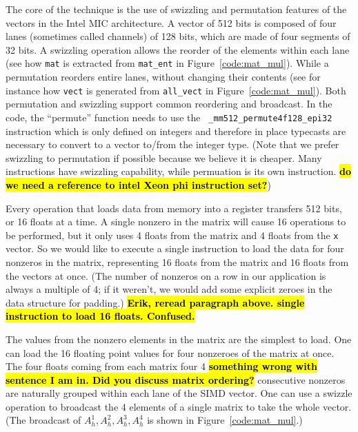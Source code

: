 \documentclass[10pt,conference,compsocconf]{IEEEtran}
\newcommand{\todo}[1]{{\color{red}\textbf{\hl{#1}}\xspace}}
\begin{document}
The core of the technique is the use of swizzling and permutation
features of the vectors in the Intel MIC architecture. A vector of 512
bits is composed of four lanes (sometimes called channels) of 128
bits, which are made of four segments of 32 bits. A swizzling
operation allows the reorder of the elements within each lane (see how
{\tt mat} is extracted from {\tt mat\_ent} in
Figure~\ref{code:mat_mul}). While a permutation reorders entire lanes,
without changing their contents (see for instance how {\tt vect} is
generated from {\tt all\_vect} in Figure~\ref{code:mat_mul}).  Both
permutation and swizzling support common reordering and broadcast. In
the code, the ``permute'' function needs to use the {\tt
  \_mm512\_permute4f128\_epi32} instruction which is only defined on
integers and therefore in place typecasts are necessary to convert to
a vector to/from the integer type.  (Note that we prefer swizzling to
permutation if possible because we believe it is cheaper. Many
instructions have swizzling capability, while permuation is its own
instruction. \todo{do we need a reference to intel Xeon phi instruction set?})

Every operation that loads data from memory into a register
transfers 512 bits, or 16 floats at a time. A single nonzero
in the matrix will cause 16 operations to be performed, but it only
uses 4 floats from the matrix and 4 floats from the {\tt x} vector. So
we would like to execute a single instruction to load the data for four 
nonzeros in the matrix, representing 16 floats from the matrix and 16 floats from the vectors
at once. (The number of nonzeros on a row in our application is
always a multiple of 4; if it weren't, we would add some explicit
zeroes in the data structure for padding.)
\todo{Erik, reread paragraph above. single instruction to load 16 floats. Confused.}

The values from the nonzero elements in the matrix are the simplest to
load. One can load the 16 floating point values for four nonzeroes of
the matrix at once. The four floats coming from each matrix four 4
\todo{something wrong with sentence I am in. Did you discuss matrix ordering?}
consecutive nonzeros are naturally grouped within each lane of the
SIMD vector. One can use a swizzle operation to broadcast the 4
elements of a single matrix to take the whole vector. (The broadcast of 
$A_h^1,A_h^2,A_h^3,A_h^4$ is shown in Figure~\ref{code:mat_mul}.)
\end{document}
